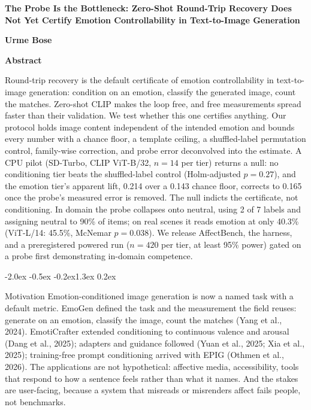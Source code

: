 \documentclass[10pt]{article}
\makeatletter
\renewcommand\section{\@startsection{section}{1}{\z@}%
  {-2.0ex \@plus -0.5ex \@minus -0.2ex}{1.3ex \@plus 0.2ex}{\large\bfseries\raggedright}}
\makeatother
\begin{document}
\begin{center}
{\LARGE\bfseries The Probe Is the Bottleneck: Zero-Shot Round-Trip Recovery Does Not Yet Certify Emotion Controllability in Text-to-Image Generation\par}
\vspace{14pt}
{\bfseries Urme Bose}
\end{center}
{\let\thefootnote\relax{}}
\vspace{4pt}

\begin{center}\textbf{Abstract}\end{center}
\vspace{-4pt}
\begin{list}{}{\leftmargin=0.4in \rightmargin=0.4in}\item\relax
Round-trip recovery is the default certificate of emotion controllability in text-to-image generation: condition on an emotion, classify the generated image, count the matches. Zero-shot CLIP makes the loop free, and free measurements spread faster than their validation. We test whether this one certifies anything. Our protocol holds image content independent of the intended emotion and bounds every number with a chance floor, a template ceiling, a shuffled-label permutation control, family-wise correction, and probe error deconvolved into the estimate. A CPU pilot (SD-Turbo, CLIP ViT-B/32, $n=14$ per tier) returns a null: no conditioning tier beats the shuffled-label control (Holm-adjusted $p=0.27$), and the emotion tier's apparent lift, 0.214 over a 0.143 chance floor, corrects to 0.165 once the probe's measured error is removed. The null indicts the certificate, not conditioning. In domain the probe collapses onto neutral, using 2 of 7 labels and assigning neutral to 90\% of items; on real scenes it reads emotion at only 40.3\% (ViT-L/14: 45.5\%, McNemar $p=0.038$). We release AffectBench, the harness, and a preregistered powered run ($n=420$ per tier, at least 95\% power) gated on a probe first demonstrating in-domain competence.
\end{list}
\vspace{4pt}

\section{Motivation}
Emotion-conditioned image generation is now a named task with a default metric. EmoGen defined the task and the measurement the field reuses: generate on an emotion, classify the image, count the matches (Yang et al., 2024). EmotiCrafter extended conditioning to continuous valence and arousal (Dang et al., 2025); adapters and guidance followed (Yuan et al., 2025; Xia et al., 2025); training-free prompt conditioning arrived with EPIG (Othmen et al., 2026). The applications are not hypothetical: affective media, accessibility, tools that respond to how a sentence feels rather than what it names. And the stakes are user-facing, because a system that misreads or misrenders affect fails people, not benchmarks.
\end{document}
